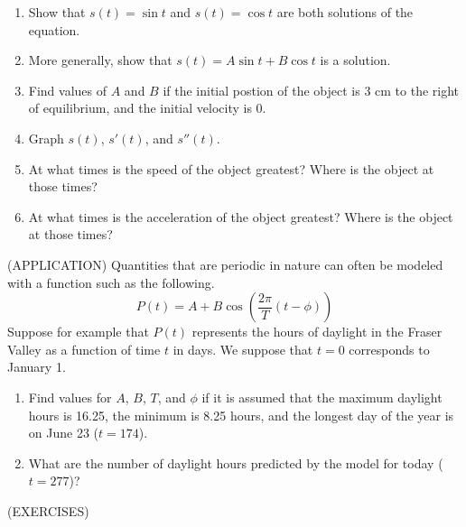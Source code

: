 \documentclass[11pt]{article}
\begin{document}
\vspace{4in}


\begin{enumerate}
\item{Show that $s(t) = \sin{t}$ and $s(t) = \cos{t}$ are both solutions of the equation.}
  \vspace{2in}
\item{More generally, show that $s(t) = A\sin{t} + B\cos{t}$ is a solution.}
  \vspace{2in}
\item{Find values of $A$ and $B$ if the initial postion of the object is 3 cm to the right of equilibrium,
  and the initial velocity is 0.}
    \vspace{2in}
  \item{Graph $s(t)$, $s'(t)$, and $s''(t)$.}
        \vspace{3in}
  \item{At what times is the speed of the object greatest?  Where is the object at those times?}
            \vspace{1in}
   \item{At what times is the acceleration of the object greatest?  Where is the object at those times?}

    \vspace{2in}
\end{enumerate}

\pagebreak
  (APPLICATION)
  Quantities that are periodic in nature can often be modeled with a function such as the following.
  \begin{displaymath}
P(t) = A + B\cos{\left(\frac{2\pi}{T}(t-\phi)  \right)}
      \end{displaymath}
  \vspace{3in}
  Suppose for example that $P(t)$ represents the hours of daylight in the Fraser Valley as a function of time $t$ in days.
  We suppose that $t=0$ corresponds to January 1.
\begin{enumerate}
\item{  Find values for $A$, $B$, $T$, and $\phi$ if it is assumed that the maximum
  daylight hours is 16.25, the minimum is 8.25 hours, and the longest day of the year is on June 23 ($t=174$).}
  \item{What are the number of daylight hours predicted by the model for today ($t=277$)?}
  \end{enumerate}
  

  \pagebreak
(EXERCISES)\\
\end{document}
